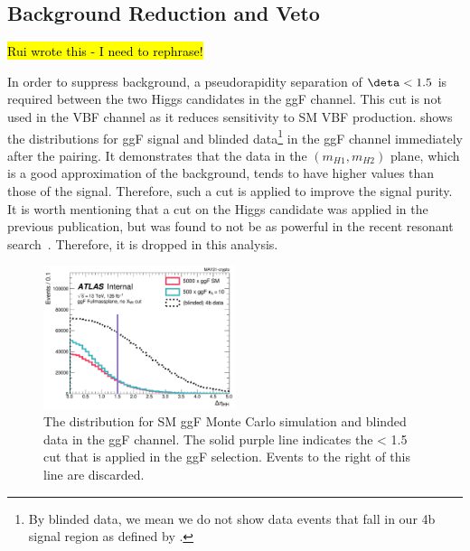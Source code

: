\subsection{Background Reduction and \ttbar Veto}
\label{subsec:bkg-reduction}

\hl{Rui wrote this - I need to rephrase!}

In order to suppress background, a pseudorapidity separation of $\deta < 1.5$ is required between the two Higgs candidates in the ggF channel. This cut is not used in the VBF channel as it reduces sensitivity to SM VBF \HH production. \Fig{\ref{fig:dEta-ggf}} shows the \deta distributions for ggF \HH signal and blinded data\footnote{By blinded data, we mean we do not show data events that fall in our 4b signal region as defined by \Eqn{\ref{eq:xhh}}.} in the ggF channel immediately after the pairing. It demonstrates that the data in the $(m_{H1}, m_{H2})$ plane, which is a good approximation of the background, tends to have higher values than those of the signal. Therefore, such a cut is applied to improve the signal purity.
It is worth mentioning that a cut on the Higgs candidate \pt was applied in the previous publication, but was found to not be as powerful in the recent resonant search~\cite{pT_Cut_and_Muon-in-jet_Correction}.
Therefore, it is dropped in this analysis.

\begin{figure}[b]
    \centering
    \includegraphics[width=0.5\textwidth]{figures/nr-int-note/selection/V3/dEta_hh_ggF_fullmassplane_all_4b_sm_k10.pdf}
    \caption{The \deta distribution for SM ggF \HH Monte Carlo simulation and blinded data in the ggF channel. The solid purple line indicates the \deta < 1.5 cut that is applied in the ggF selection. Events to the right of this line are discarded.}
    \label{fig:dEta-ggf}
\end{figure}

